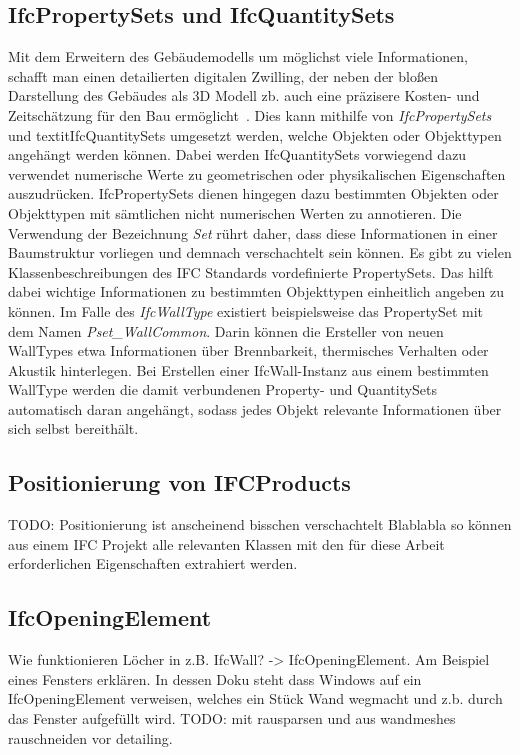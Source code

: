 \subsection{IfcPropertySets und IfcQuantitySets}\label{basics:ifc_properties}
Mit dem Erweitern des Gebäudemodells um möglichst viele Informationen, schafft man einen detailierten digitalen Zwilling, der neben der bloßen Darstellung des Gebäudes als 3D Modell zb. auch eine präzisere Kosten- und Zeitschätzung für den Bau ermöglicht~\cite{Industry93:online}. 
Dies kann mithilfe von \textit{IfcPropertySets} und textit{IfcQuantitySets} umgesetzt werden, welche Objekten oder Objekttypen angehängt werden können.
Dabei werden IfcQuantitySets vorwiegend dazu verwendet numerische Werte zu geometrischen oder physikalischen Eigenschaften auszudrücken.
IfcPropertySets dienen hingegen dazu bestimmten Objekten oder  Objekttypen mit sämtlichen nicht numerischen Werten zu annotieren.
Die Verwendung der Bezeichnung \textit{Set} rührt daher, dass diese Informationen in einer Baumstruktur vorliegen und demnach verschachtelt sein können.
Es gibt zu vielen Klassenbeschreibungen des IFC Standards vordefinierte PropertySets.
Das hilft dabei wichtige Informationen zu bestimmten Objekttypen einheitlich angeben zu können.
Im Falle des \textit{IfcWallType} existiert beispielsweise das PropertySet mit dem Namen \textit{Pset_WallCommon}.
Darin können die Ersteller von neuen WallTypes etwa Informationen über Brennbarkeit, thermisches Verhalten oder Akustik hinterlegen.
Bei Erstellen einer IfcWall-Instanz aus einem bestimmten WallType werden die damit verbundenen Property- und QuantitySets automatisch daran angehängt, sodass jedes Objekt relevante Informationen über sich selbst bereithält.

\subsection{Positionierung von IFCProducts}
TODO: Positionierung ist anscheinend bisschen verschachtelt
Blablabla so können aus einem IFC Projekt alle relevanten Klassen mit den für diese Arbeit erforderlichen Eigenschaften extrahiert werden.


\subsection{IfcOpeningElement}
\label{basics:IfcOpeningElement}
Wie funktionieren Löcher in z.B. IfcWall? -> IfcOpeningElement.
Am Beispiel eines Fensters erklären. In dessen Doku steht dass Windows auf ein IfcOpeningElement verweisen, welches ein Stück Wand wegmacht und z.b. durch das Fenster aufgefüllt wird.
TODO: mit rausparsen und aus wandmeshes rauschneiden vor detailing.

